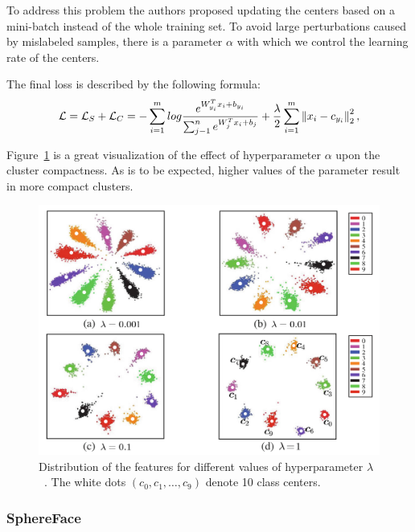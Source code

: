 To address this problem the authors proposed updating the centers based on a mini-batch instead of the whole training
set.
To avoid large perturbations caused by mislabeled samples, there is a parameter $\alpha$ with which we control the
learning rate of the centers.

The final loss is described by the following formula:
\begin{equation}
    \label{eq:centerloss}
    \mathcal{L} = \mathcal{L}_S + \mathcal{L}_C = -\sum_{i=1}^{m} log \frac{e^{W^T_{y_i} x_{i} + b_{y_i}}}
    {\sum_{j-1}^{n} e^{W^T_{j} x_{i} + b_{j}}} + \frac{\lambda}{2} \sum_{i=1}^{m} \left\lVert x_i - c_{y_i}\right\rVert_2^2,
\end{equation}

Figure~\ref{fig:centerlosslambda} is a great visualization of the effect of hyperparameter $\alpha$ upon the cluster
compactness.
As is to be expected, higher values of the parameter result in more compact clusters.

\begin{figure}[H]
    \centering
    \includegraphics[width=\columnwidth]{images/face-recognition/centerlosslambda.png}
    \caption{Distribution of the features for different values of hyperparameter $\lambda$~\cite{CenterLoss}.
    The white dots $(c_0,c_1,\dots,c_9)$ denote 10 class centers.}
    \label{fig:centerlosslambda}
\end{figure}


\subsubsection{SphereFace}

